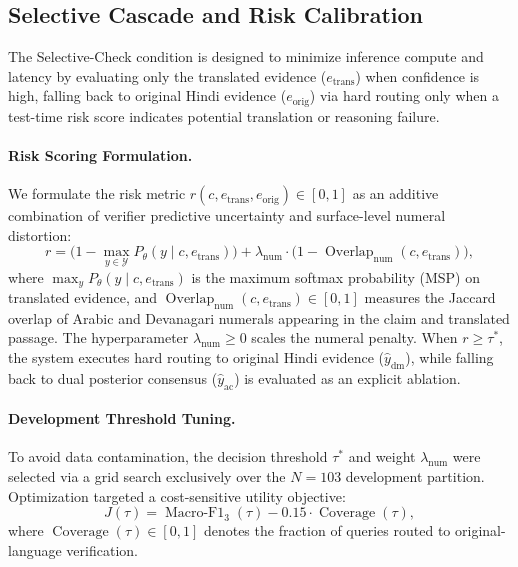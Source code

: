 \subsection{Selective Cascade and Risk Calibration}
\label{sec:risk_calibration}
The Selective-Check condition is designed to minimize inference compute and latency by evaluating only the translated evidence ($e_{\text{trans}}$) when confidence is high, falling back to original Hindi evidence ($e_{\text{orig}}$) via hard routing only when a test-time risk score indicates potential translation or reasoning failure.

\paragraph{Risk Scoring Formulation.}
We formulate the risk metric $r(c, e_{\text{trans}}, e_{\text{orig}}) \in [0, 1]$ as an additive combination of verifier predictive uncertainty and surface-level numeral distortion:
\begin{equation}
    r = \big(1 - \max_{y \in \mathcal{Y}} P_\theta(y \mid c, e_{\text{trans}})\big) + \lambda_{\text{num}} \cdot \big(1 - \operatorname{Overlap}_{\text{num}}(c, e_{\text{trans}})\big),
    \label{eq:risk_score}
\end{equation}
where $\max_y P_\theta(y \mid c, e_{\text{trans}})$ is the maximum softmax probability (MSP) on translated evidence, and $\operatorname{Overlap}_{\text{num}}(c, e_{\text{trans}}) \in [0, 1]$ measures the Jaccard overlap of Arabic and Devanagari numerals appearing in the claim and translated passage. The hyperparameter $\lambda_{\text{num}} \ge 0$ scales the numeral penalty. When $r \ge \tau^*$, the system executes hard routing to original Hindi evidence ($\hat{y}_{\text{dm}}$), while falling back to dual posterior consensus ($\hat{y}_{\text{ac}}$) is evaluated as an explicit ablation.

\paragraph{Development Threshold Tuning.}
To avoid data contamination, the decision threshold $\tau^*$ and weight $\lambda_{\text{num}}$ were selected via a grid search exclusively over the $N=103$ development partition. Optimization targeted a cost-sensitive utility objective:
\begin{equation}
    J(\tau) = \operatorname{Macro-F1}_3(\tau) - 0.15 \cdot \operatorname{Coverage}(\tau),
\end{equation}
where $\operatorname{Coverage}(\tau) \in [0, 1]$ denotes the fraction of queries routed to original-language verification.

